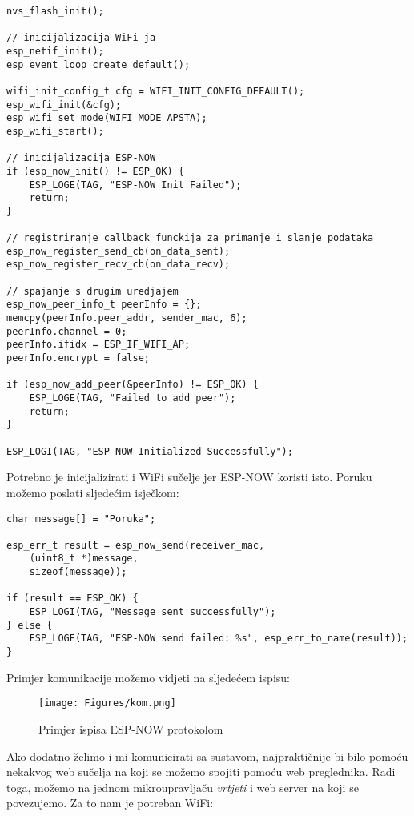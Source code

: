 \documentclass[seminarskirad]{fer}
\begin{document}
\begin{lstlisting}[caption=Inicijalizacija protokola]
nvs_flash_init();

// inicijalizacija WiFi-ja
esp_netif_init();
esp_event_loop_create_default();

wifi_init_config_t cfg = WIFI_INIT_CONFIG_DEFAULT();
esp_wifi_init(&cfg);
esp_wifi_set_mode(WIFI_MODE_APSTA);
esp_wifi_start();

// inicijalizacija ESP-NOW
if (esp_now_init() != ESP_OK) {
    ESP_LOGE(TAG, "ESP-NOW Init Failed");
    return;
}

// registriranje callback funckija za primanje i slanje podataka
esp_now_register_send_cb(on_data_sent);
esp_now_register_recv_cb(on_data_recv);

// spajanje s drugim uredjajem
esp_now_peer_info_t peerInfo = {};
memcpy(peerInfo.peer_addr, sender_mac, 6);
peerInfo.channel = 0;
peerInfo.ifidx = ESP_IF_WIFI_AP; 
peerInfo.encrypt = false;

if (esp_now_add_peer(&peerInfo) != ESP_OK) {
    ESP_LOGE(TAG, "Failed to add peer");
    return;
}

ESP_LOGI(TAG, "ESP-NOW Initialized Successfully");
\end{lstlisting}

Potrebno je inicijalizirati i WiFi sučelje jer ESP-NOW koristi isto. Poruku možemo poslati sljedećim isječkom:

\begin{lstlisting}[caption=Komunikacija ESP-NOW protokolom]
char message[] = "Poruka";
    
esp_err_t result = esp_now_send(receiver_mac, 
    (uint8_t *)message, 
    sizeof(message));

if (result == ESP_OK) {
    ESP_LOGI(TAG, "Message sent successfully");
} else {
    ESP_LOGE(TAG, "ESP-NOW send failed: %s", esp_err_to_name(result));
}
\end{lstlisting}

Primjer komunikacije možemo vidjeti na sljedećem ispisu:

\begin{figure}[h!]
  \centering
  \texttt{[image: Figures/kom.png]} 
  \caption{Primjer ispisa ESP-NOW protokolom}
  \label{slk:kom}
\end{figure}

Ako dodatno želimo i mi komunicirati sa sustavom, najpraktičnije bi bilo pomoću nekakvog web sučelja na koji se možemo spojiti pomoću web preglednika. Radi toga, možemo na jednom mikroupravljaču \textit{vrtjeti} i web server na koji se povezujemo. Za to nam je potreban WiFi:
\end{document}
